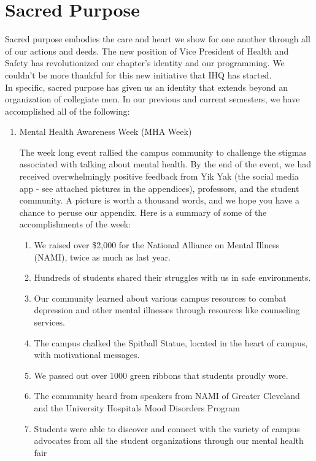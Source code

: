 \chapter{Sacred Purpose}

  Sacred purpose embodies the care and heart we show for one another through all of our actions and deeds. The new position of Vice President of Health and Safety has revolutionized our chapter's identity and our programming. We couldn't be more thankful for this new initiative that IHQ has started. \\

  In specific, sacred purpose has given us an identity that extends beyond an organization of collegiate men. In our previous and current semesters, we have accomplished all of the following:
  
  \begin{enumerate}
    \item Mental Health Awareness Week (MHA Week)
  	
  	The week long event rallied the campus community to challenge the stigmas associated with talking about mental health. By the end of the event, we had received overwhelmingly positive feedback from Yik Yak (the social media app - see attached pictures in the appendices), professors, and the student community.  A picture is worth a thousand words, and we hope you have a chance to peruse our appendix. Here is a summary of some of the accomplishments of the week:
  	
  	\begin{enumerate}
	      \item We raised over \$2,000 for the National Alliance on Mental Illness (NAMI), twice as much as last year.  		
	      \item Hundreds of students shared their struggles with us in safe environments.  		
	      \item Our community learned about various campus resources to combat depression and other mental illnesses through resources like counseling services.	      
	      \item The campus chalked the Spitball Statue, located in the heart of campus, with motivational messages.
	      \item We passed out over 1000 green ribbons that students proudly wore.
	      \item The community heard from speakers from NAMI of Greater Cleveland and the University Hospitals Mood Disorders Program
	      \item Students were able to discover and connect with the variety of campus advocates from all the student organizations through our mental health fair
  	\end{enumerate}
  	

\end{enumerate}
